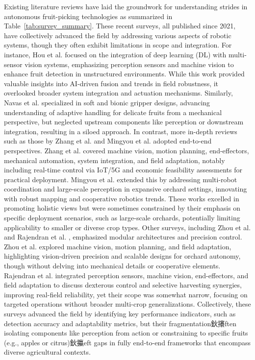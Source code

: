 \documentclass[a4paper,fleqn]{cas-dc}
\begin{document}
Existing literature reviews have laid the groundwork for understanding strides in autonomous fruit-picking technologies as summarized in Table~\ref{tab:survey_summary}. These recent surveys, all published since 2021, have collectively advanced the field by addressing various aspects of robotic systems, though they often exhibit limitations in scope and integration.
For instance, Hou et al. \cite{hou2023overview} focused on the integration of deep learning (DL) with multi-sensor vision systems, emphasizing perception sensors and machine vision to enhance fruit detection in unstructured environments. While this work provided valuable insights into AI-driven fusion and trends in field robustness, it overlooked broader system integration and actuation mechanisms. Similarly, Navas et al. \cite{navas2021soft} specialized in soft and bionic gripper designs, advancing understanding of adaptive handling for delicate fruits from a mechanical perspective, but neglected upstream components like perception or downstream integration, resulting in a siloed approach.
In contrast, more in-depth reviews such as those by Zhang et al. \cite{zhang2024automatic} and Mingyou et al. \cite{mingyou2024orchard} adopted end-to-end perspectives. Zhang et al. covered machine vision, motion planning, end-effectors, mechanical automation, system integration, and field adaptation, notably including real-time control via IoT/5G and economic feasibility assessments for practical deployment. Mingyou et al. extended this by addressing multi-robot coordination and large-scale perception in expansive orchard settings, innovating with robust mapping and cooperative robotics trends. These works excelled in promoting holistic views but were sometimes constrained by their emphasis on specific deployment scenarios, such as large-scale orchards, potentially limiting applicability to smaller or diverse crop types.
Other surveys, including Zhou et al. \cite{zhou2022intelligent} and Rajendran et al. \cite{rajendran2024towards}, emphasized modular architectures and precision control. Zhou et al. explored machine vision, motion planning, and field adaptation, highlighting vision-driven precision and scalable designs for orchard autonomy, though without delving into mechanical details or cooperative elements. Rajendran et al. integrated perception sensors, machine vision, end-effectors, and field adaptation to discuss dexterous control and selective harvesting synergies, improving real-field reliability, yet their scope was somewhat narrow, focusing on targeted operations without broader multi-crop generalizations. Collectively, these surveys advanced the field by identifying key performance indicators, such as detection accuracy and adaptability metrics, but their fragmentation鈥攐ften isolating components like perception from action or constraining to specific fruits (e.g., apples or citrus)鈥攍eft gaps in fully end-to-end frameworks that encompass diverse agricultural contexts.
\end{document}
